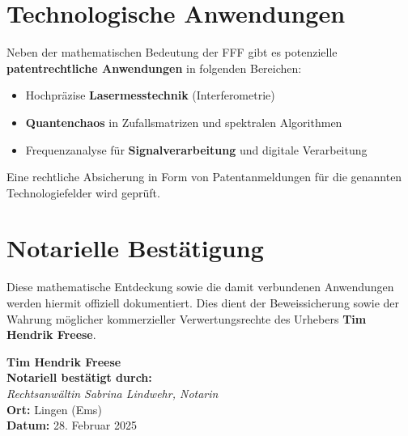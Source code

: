 \documentclass[a4paper,12pt]{article}
\begin{document}
\section{Technologische Anwendungen}

Neben der mathematischen Bedeutung der FFF gibt es potenzielle \textbf{patentrechtliche Anwendungen} in folgenden Bereichen:

\begin{itemize}
    \item Hochpräzise \textbf{Lasermesstechnik} (Interferometrie)
    \item \textbf{Quantenchaos} in Zufallsmatrizen und spektralen Algorithmen
    \item Frequenzanalyse für \textbf{Signalverarbeitung} und digitale Verarbeitung
\end{itemize}

Eine rechtliche Absicherung in Form von Patentanmeldungen für die genannten Technologiefelder wird geprüft.

\section{Notarielle Bestätigung}

Diese mathematische Entdeckung sowie die damit verbundenen Anwendungen werden hiermit offiziell dokumentiert. Dies dient der Beweissicherung sowie der Wahrung möglicher kommerzieller Verwertungsrechte des Urhebers \textbf{Tim Hendrik Freese}.

\vspace{2cm}

\begin{flushright}
\textbf{Tim Hendrik Freese} \\
\vspace{0.5cm}
\textbf{Notariell bestätigt durch:} \\
\vspace{1cm}
\textit{Rechtsanwältin Sabrina Lindwehr, Notarin} \\
\vspace{1cm}
\textbf{Ort:} Lingen (Ems)\\
\textbf{Datum:} 28. Februar 2025
\end{flushright}
\end{document}
